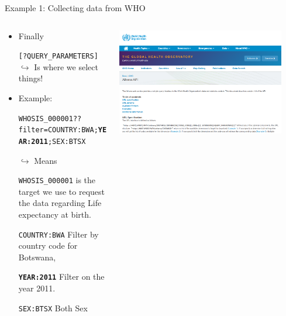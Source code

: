 \documentclass[xcolor=x11names,compress]{beamer}
\renewcommand{\(}{\begin{columns}}
\renewcommand{\)}{\end{columns}}
\newcommand{\<}[1]{\begin{column}{#1}}
\renewcommand{\>}{\end{column}}
\begin{document}
\begin{frame}{Example 1: Collecting data from WHO}
\begin{columns}[T]
  \begin{column}{0.8\textwidth}
    \begin{itemize}[<+->]
       \item Finally
       \item[]\small{\texttt{[?QUERY\_PARAMETERS]}} $\hookrightarrow$ Is where we select things!
       \item Example:
       \item[]\small{\texttt{\textcolor{brique}{WHOSIS\_000001}??filter=\textcolor{siap}{COUNTRY:BWA};\textbf{YEAR:2011};\textcolor{vert}{SEX:BTSX}}}
       \item[$\hookrightarrow$ ] Means
        \item[]\texttt{\textcolor{brique}{WHOSIS\_000001}} is the target we use to request the data regarding Life expectancy at birth.
        \item[]\texttt{\textcolor{siap}{COUNTRY:BWA}} Filter by country  code for Botswana,
        \item[]\texttt{\textbf{YEAR:2011}} Filter on the year 2011.
         \item[]\texttt{\textcolor{vert}{SEX:BTSX}} Both Sex
     \end{itemize}
     \end{column}

    \begin{column}{0.2\textwidth}
    \begin{center}
      \href{https://www.who.int/data/gho/info/athena-api}{\includegraphics[width=0.9\textwidth]{WHO_API.PNG}}
    \end{center}
    \end{column}
\end{columns}
\end{frame}
\end{document}

